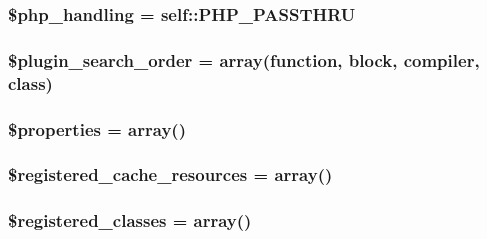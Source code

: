 \subsubsection[{\$php\+\_\+handling}]{\setlength{\rightskip}{0pt plus 5cm}\$php\+\_\+handling = self\+::\+P\+H\+P\+\_\+\+P\+A\+S\+S\+T\+H\+R\+U}\label{class_smarty_abb37c3c6b2bcb9a527c4139bffb7e6ca}
\hypertarget{class_smarty_ab943c28191f0e4f5d648d66aef9cf289}{}
\subsubsection[{\$plugin\+\_\+search\+\_\+order}]{\setlength{\rightskip}{0pt plus 5cm}\$plugin\+\_\+search\+\_\+order = array(\textquotesingle{}function\textquotesingle{}, \textquotesingle{}block\textquotesingle{}, \textquotesingle{}compiler\textquotesingle{}, \textquotesingle{}class\textquotesingle{})}\label{class_smarty_ab943c28191f0e4f5d648d66aef9cf289}
\hypertarget{class_smarty_a7f675de4b5983d7e84f6573b7d4d453d}{}
\subsubsection[{\$properties}]{\setlength{\rightskip}{0pt plus 5cm}\$properties = array()}\label{class_smarty_a7f675de4b5983d7e84f6573b7d4d453d}
\hypertarget{class_smarty_a419a3cb24e76bf8b59991a0be944e87f}{}
\subsubsection[{\$registered\+\_\+cache\+\_\+resources}]{\setlength{\rightskip}{0pt plus 5cm}\$registered\+\_\+cache\+\_\+resources = array()}\label{class_smarty_a419a3cb24e76bf8b59991a0be944e87f}
\hypertarget{class_smarty_aa8f2a5bf79dcbe341a65e526ab20dee9}{}
\subsubsection[{\$registered\+\_\+classes}]{\setlength{\rightskip}{0pt plus 5cm}\$registered\+\_\+classes = array()}\label{class_smarty_aa8f2a5bf79dcbe341a65e526ab20dee9}
\hypertarget{class_smarty_a5fcb30291f6413ff9100e3f66f201764}{}
